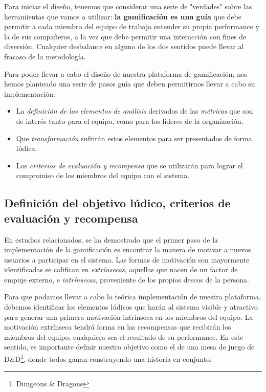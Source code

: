 \documentclass[journal]{IEEEtran}
\begin{document}
Para iniciar el diseño, tenemos que considerar una serie de "verdades" sobre las herramientas que vamos a utilizar: \textbf{la gamificación es una guía} que debe permitir a cada miembro del equipo de trabajo entender su propia performance y la de sus compañeros, a la vez que debe permitir una interacción con fines de diversión. Cualquier desbalance en alguno de los dos sentidos puede llevar al fracaso de la metodología\cite[Quinta Parte: Gamificación - De los desafíos y misiones]{nallar2015estructuraludica}.

Para poder llevar a cabo el diseño de nuestra plataforma de gamificación, nos hemos planteado una serie de pasos guía que deben permitirnos llevar a cabo su implementación:

\begin{itemize}
    \item La \textit{definición de los elementos de análisis} derivados de las \textit{métricas} que son de interés tanto para el equipo, como para los líderes de la organización.
    \item Que \textit{transformación} sufrirán estos elementos para ser presentados de forma lúdica.
    \item Los \textit{criterios de evaluación y recompensa} que se utilizarán para lograr el compromiso de los miembros del equipo con el sistema.
\end{itemize}

\subsection{\textbf{Definición del objetivo lúdico, criterios de evaluación y recompensa}}

En estudios relacionados, se ha demostrado que el primer paso de la implementación de la gamificación es encontrar la manera de motivar a nuevos usuarios a participar en el sistema\cite{meng2014gamification}. Las formas de motivación son mayormente identificadas se califican en \textit{extrínsecas}, aquellas que nacen de un factor de empuje externo, e \textit{intrínsecas}, proveniente de los propios deseos de la persona.

Para que podamos llevar a cabo la teórica implementación de nuestra plataforma, debemos identificar los elementos lúdicos que harán al sistema visible y atractivo para generar una primera motivación intrínseca en los miembros del equipo. La motivación extrínseca tendrá forma en las recompensas que recibirán los miembros del equipo, cualquiera sea el resultado de su performance. En este sentido, es importante definir nuestro objetivo como el de una mesa de juego de D\&D\footnote{Dungeons \& Dragons}, donde todos ganan construyendo una historia en conjunto.
\end{document}
